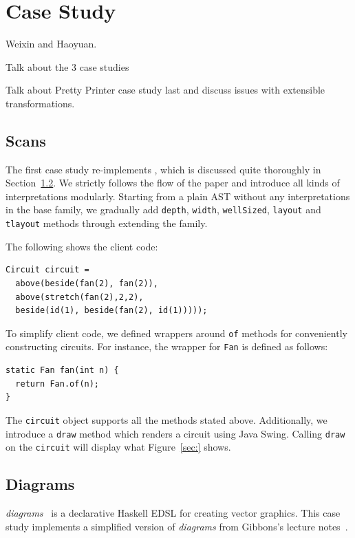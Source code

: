 \section{Case Study}

Weixin and Haoyuan.

Talk about the 3 case studies

Talk about Pretty Printer case study last and discuss issues with
extensible transformations.

\subsection{Scans}
The first case study re-implements \dsl, which is discussed quite thoroughly in
Section~\ref{}.
We strictly follows the flow of the paper and introduce all kinds of
interpretations modularly.
Starting from a plain AST without any interpretations in the base family, we gradually add
\texttt{depth}, \texttt{width}, \texttt{wellSized}, \texttt{layout} and
\texttt{tlayout} methods through extending the family.

The following shows the client code:
\begin{lstlisting}
Circuit circuit =
  above(beside(fan(2), fan(2)),
  above(stretch(fan(2),2,2),
  beside(id(1), beside(fan(2), id(1)))));
\end{lstlisting}

To simplify client code, we defined wrappers around \texttt{of} methods
for conveniently constructing circuits. For instance, the wrapper for
\texttt{Fan} is defined as follows:
\begin{lstlisting}
static Fan fan(int n) {
  return Fan.of(n);
}
\end{lstlisting}
The \texttt{circuit} object supports all the methods stated above.
Additionally, we introduce a \texttt{draw} method which renders a
circuit using Java Swing.
Calling \texttt{draw} on the \texttt{circuit} will
display what Figure~\ref{sec:} shows.

\begin{figure}
\end{figure}



\subsection{Diagrams}
\emph{diagrams}~\cite{yates2015diagrams} is a declarative Haskell EDSL for creating vector graphics.
This case study implements a simplified version of \emph{diagrams} from
Gibbons's lecture notes~\cite{gibbonsexercises}.

